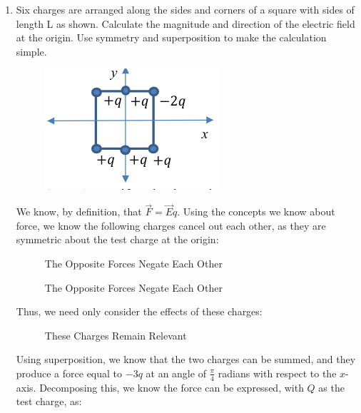 \begin{enumerate}

  \item Six charges are arranged along the sides and corners of a square with sides of length L as shown. Calculate the magnitude and direction of the electric field at the origin. Use symmetry and superposition to make the calculation simple.

    \begin{center}
      \begin{figure}[h]
        \centering
        \includegraphics[width=.4\textwidth]{Figures/Figure2-1.png}
        \label{fig:1}
      \end{figure}
    \end{center}

    We know, by definition, that $\vec{F}=\vec{E}q$. Using the concepts we know about force, we know the following charges cancel out each other, as they are symmetric about the test charge at the origin:

    \begin{figure}[H]
      \centering
      
      \caption{The Opposite Forces Negate Each Other}
      \label{fig:3}
    \end{figure}

    \begin{figure}[H]
      \centering
      
      \caption{The Opposite Forces Negate Each Other}
      \label{fig:4}
    \end{figure}

    Thus, we need only consider the effects of these charges:

    \begin{figure}[H]
      \centering
      
      \caption{These Charges Remain Relevant}
      \label{fig:5}
    \end{figure}

    Using superposition, we know that the two charges can be summed, and they produce a force equal to $-3q$ at an angle of $\frac{\pi}{4}$ radians with respect to the $x$-axis. Decomposing this, we know the force can be expressed, with $Q$ as the test charge, as:


\end{enumerate}

